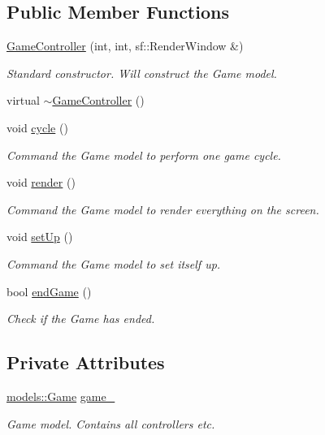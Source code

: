 \subsection*{\-Public \-Member \-Functions}
\begin{DoxyCompactItemize}
\item 
\hyperlink{classcontrollers_1_1GameController_a124f9b3c86f81f813385e73117c805ce}{\-Game\-Controller} (int, int, sf\-::\-Render\-Window \&)
\begin{DoxyCompactList}\small\item\em \-Standard constructor. \-Will construct the \-Game model. \end{DoxyCompactList}\item 
virtual \hyperlink{classcontrollers_1_1GameController_af0d95561a2b71ff314c2189ba1aa1813}{$\sim$\-Game\-Controller} ()
\item 
void \hyperlink{classcontrollers_1_1GameController_a63a7adb459f00d81e41764c66da7281e}{cycle} ()
\begin{DoxyCompactList}\small\item\em \-Command the \-Game model to perform one game cycle. \end{DoxyCompactList}\item 
void \hyperlink{classcontrollers_1_1GameController_aa36f4f57aa30f891815fdb21925c4bef}{render} ()
\begin{DoxyCompactList}\small\item\em \-Command the \-Game model to render everything on the screen. \end{DoxyCompactList}\item 
void \hyperlink{classcontrollers_1_1GameController_afbd75649b81132d343c3f0b00451fc54}{set\-Up} ()
\begin{DoxyCompactList}\small\item\em \-Command the \-Game model to set itself up. \end{DoxyCompactList}\item 
bool \hyperlink{classcontrollers_1_1GameController_adf88d7f2b9a68bab0645e7a613f4556d}{end\-Game} ()
\begin{DoxyCompactList}\small\item\em \-Check if the \-Game has ended. \end{DoxyCompactList}\end{DoxyCompactItemize}
\subsection*{\-Private \-Attributes}
\begin{DoxyCompactItemize}
\item 
\hyperlink{classmodels_1_1Game}{models\-::\-Game} \hyperlink{classcontrollers_1_1GameController_a255cfc430fc9e7bd9e843068accc825b}{game\-\_\-}
\begin{DoxyCompactList}\small\item\em \-Game model. \-Contains all controllers etc. \end{DoxyCompactList}\end{DoxyCompactItemize}


